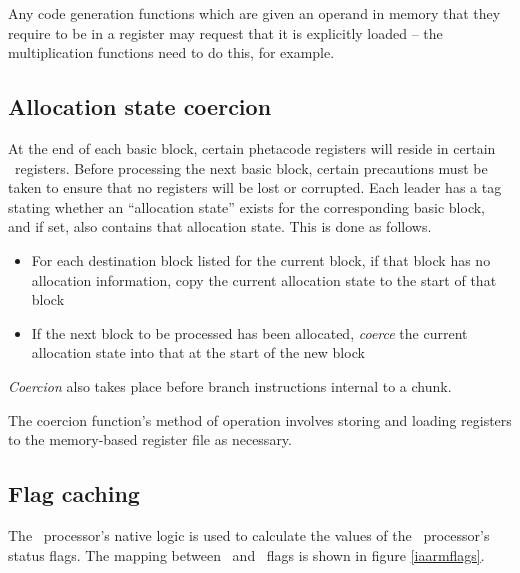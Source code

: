 Any code generation functions which are given an operand in memory that they require to be in a register may request that it is explicitly loaded -- the multiplication functions need to do this, for example.

\subsection{Allocation state coercion}

At the end of each basic block, certain phetacode registers will reside in certain \ia\ registers. Before processing the next basic block, certain precautions must be taken to ensure that no registers will be lost or corrupted. Each leader has a tag stating whether an ``allocation state'' exists for the corresponding basic block, and if set, also contains that allocation state. This is done as follows. 

\begin{itemize}

\item For each destination block listed for the current block, if that block has no allocation information, copy the current allocation state to the start of that block
\item If the next block to be processed has been allocated, {\it coerce} the current allocation state into that at the start of the new block

\end{itemize}

{\it Coercion} also takes place before branch instructions internal to a chunk.

The coercion function's method of operation involves storing and loading registers to the memory-based register file as necessary.

\subsection{Flag caching}

The \ia\ processor's native logic is used to calculate the values of the \arm\ processor's status flags. The mapping between \ia\ and \arm\ flags is shown in figure \ref{iaarmflags}.

